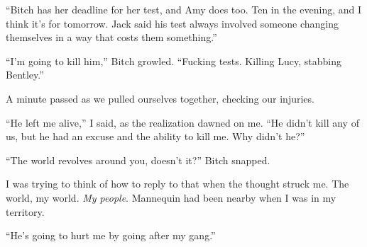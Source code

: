 ``Bitch has her deadline for her test, and Amy does too.  Ten in the evening, and I think it's for tomorrow.  Jack said his test always involved someone changing themselves in a way that costs them something.''



``I'm going to kill him,'' Bitch growled.  ``Fucking tests.  Killing Lucy, stabbing Bentley.''



A minute passed as we pulled ourselves together, checking our injuries.



``He left me alive,'' I said, as the realization dawned on me.  ``He didn't kill any of us, but he had an excuse and the ability to kill me.  Why didn't he?''



``The world revolves around you, doesn't it?''  Bitch snapped.



I was trying to think of how to reply to that when the thought struck me.  The world, my world.  \emph{My people}.  Mannequin had been nearby when I was in my territory.



``He's going to hurt me by going after my gang.''






